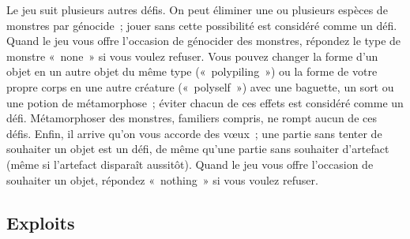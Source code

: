 \documentclass[titlepage]{article}
\begin{document}
Le jeu suit plusieurs autres défis.
On peut éliminer une ou plusieurs espèces de monstres par génocide~; jouer
sans cette possibilité est considéré comme un défi.
Quand le jeu vous offre l'occasion de génocider des monstres, répondez le
type de monstre «~none~» si vous voulez refuser.
Vous pouvez changer la forme d'un objet en un autre objet du même type
(«~polypiling~») ou la forme de votre propre corps en une autre
créature («~polyself~») avec une baguette, un sort ou une potion de
métamorphose~; éviter chacun de ces effets est considéré comme un défi.
Métamorphoser des monstres, familiers compris, ne rompt aucun de ces
défis.
Enfin, il arrive qu'on vous accorde des vœux~; une partie sans tenter de
souhaiter un objet est un défi, de même qu'une partie sans souhaiter
d'artefact (même si l'artefact disparaît aussitôt).
Quand le jeu vous offre l'occasion de souhaiter un objet, répondez
«~nothing~» si vous voulez refuser.

\subsection{Exploits}
\end{document}

